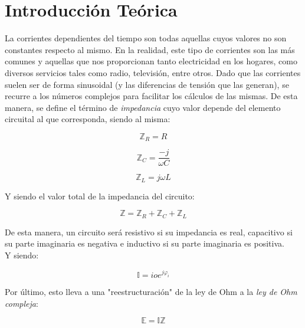 \documentclass{article}
\begin{document}
\section{Introducción Teórica}
La corrientes dependientes del tiempo son todas aquellas cuyos valores no son constantes respecto al mismo. En la realidad, este tipo de corrientes son las más comunes y aquellas que nos proporcionan tanto electricidad en los hogares, como diversos servicios tales como radio, televisión, entre otros.
Dado que las corrientes suelen ser de forma sinusoidal (y las diferencias de tensión que las generan), se recurre a los números complejos para facilitar los cálculos de las mismas. De esta manera, se define el término de \textit{impedancia} cuyo valor depende del elemento circuital al que corresponda, siendo al misma:

\begin{equation}
\mathds{Z}_R = R
\end{equation}

\begin{equation}
\mathds{Z}_C = \frac{-j}{\omega C}
\end{equation}

\begin{equation}
\mathds{Z}_L = j \omega L
\end{equation}



Y siendo el valor total de la impedancia del circuito:

\begin{equation}
\mathds{Z} = \mathds{Z}_R + \mathds{Z}_C + \mathds{Z}_L
\end{equation}

De esta manera, un circuito será resistivo si su impedancia es real, capacitivo si su parte imaginaria es negativa e inductivo si su parte imaginaria es positiva. 
\\
Y siendo:

\begin{equation}
\mathds{I} = io  e^{j\varphi_i}
\end{equation}

Por último, esto lleva a una "reestructuración" de la ley de Ohm a la \textit{ley de Ohm compleja}:

\begin{equation}
\mathds{E} = \mathds{IZ}
\end{equation}
\end{document}
